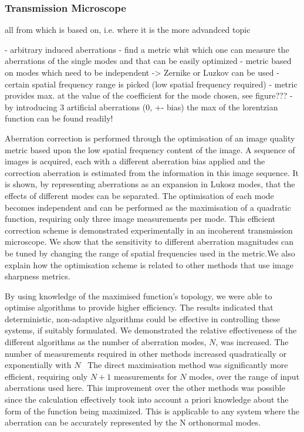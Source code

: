 \subsubsection{Transmission Microscope}
\label{sec:TransmissionMicroscope}
all from \cite{wide_AOM_loew_freq} which \cite{wide_AOM_structured_illu} is based on, i.e. where it is the more advandced topic

- arbitrary induced aberrations
- find a metric whit which one can measure the aberrations of the single 
modes and that can be easily optimized
- metric based on modes which need to be independent -> Zernike or Luzkov can 
be used
- certain spatial frequency range is picked (low spatial frequency required) 
- metric provides max. at the value of the coefficient for the mode chosen, 
see figure???
- by introducing 3 artificial aberrations (0, +- bias) the max of the 
lorentzian function can be found readily!


Aberration correction is performed through the optimisation of an image 
quality metric based upon the low spatial frequency content of the image. A 
sequence of images is acquired, each with a different aberration bias applied 
and the correction aberration is estimated from the information in this image 
sequence. It is shown, by representing aberrations as an expansion in Lukosz 
modes, that the effects of different modes can be separated. The optimisation 
of each mode becomes independent and can be performed as the maximisation of 
a quadratic function, requiring only three image measurements per mode. This 
efficient correction scheme is demonstrated experimentally in an incoherent 
transmission microscope. We show that the sensitivity to different aberration 
magnitudes can be tuned by changing the range of spatial frequencies used in 
the metric.We also explain how the optimisation scheme is related to other 
methods that use image sharpness metrics.

By using knowledge of the maximised function’s topology, we were able to 
optimise algorithms to provide higher efficiency. The results indicated that 
deterministic, non-adaptive algorithms could be effective in controlling 
these systems, if suitably formulated. We demonstrated the relative 
effectiveness of the different algorithms as the number of aberration modes, $
N$, was increased. The number of measurements required in other methods 
increased quadratically or  exponentially with $N$~\cite{wide_sphere_packing}
The direct maximisation method was significantly more efficient, requiring 
only $N+1$ measurements for $N$ modes, over the range of input aberrations 
used here. This improvement over the other methods was possible since the 
calculation effectively took into account a priori knowledge about the form 
of the function being maximized. This is applicable to any system where the 
aberration can be accurately represented by the N orthonormal modes.

